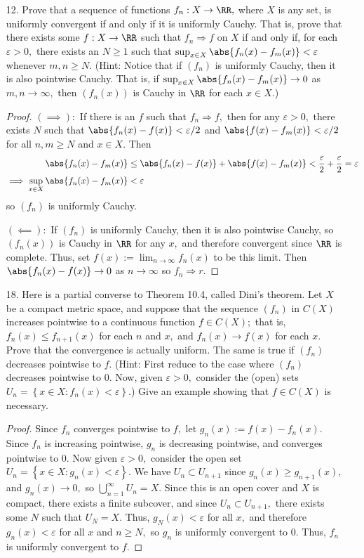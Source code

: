 \documentclass{article}
\begin{document}
\begin{itemize}
	\item[12.] Prove that a sequence of functions $f_n:X\to \RR,$ where $X$ is any set, is uniformly convergent if and only if it is uniformly Cauchy. That is, prove that there exists some $f:X\to\RR$ such that $f_n\Rightarrow f$ on $X$ if and only if, for each $\varepsilon>0,$ there exists an $N\ge 1$ such that $\sup_{x\in X}\abs{f_n(x)-f_m(x)}<\varepsilon$ whenever $m, n\ge N.$ (Hint: Notice that if $(f_n)$ is uniformly Cauchy, then it is also pointwise Cauchy. That is, if $\sup_{x\in X}\abs{f_n(x)-f_m(x)}\to 0$ as $m, n\to \infty,$ then $(f_n(x))$ is Cauchy in $\RR$ for each $x\in X.$)
		\begin{proof}
			$(\implies):$ If there is an $f$ such that $f_n\Rightarrow f,$ then for any $\varepsilon>0,$ there exists $N$ such that $\abs{f_n(x)-f(x)}<\varepsilon/2$ and $\abs{f(x)-f_m(x)}<\varepsilon/2$ for all $n, m\ge N$ and $x\in X.$ Then
			\begin{align*}
				\abs{f_n(x)-f_m(x)} &\le \abs{f_n(x)-f(x)} + \abs{f(x)-f_m(x)} < \frac{\varepsilon}{2} + \frac{\varepsilon}{2} = \varepsilon \\
				\implies \sup_{x\in X} \abs{f_n(x)-f_m(x)} &< \varepsilon
			\end{align*}
			so $(f_n)$ is uniformly Cauchy.

			$(\impliedby):$ If $(f_n)$ is uniformly Cauchy, then it is also pointwise Cauchy, so $(f_n(x))$ is Cauchy in $\RR$ for any $x,$ and therefore convergent since $\RR$ is complete. Thus, set $f(x):=\lim_{n\to\infty} f_n(x)$ to be this limit. Then $\abs{f_n(x)-f(x)}\to 0$ as $n\to\infty$ so $f_n\Rightarrow r.$
		\end{proof}

	\item[18.] Here is a partial converse to Theorem 10.4, called Dini's theorem. Let $X$ be a compact metric space, and suppose that the sequence $(f_n)$ in $C(X)$ increases pointwise to a continuous function $f\in C(X);$ that is, $f_n(x)\le f_{n+1}(x)$ for each $n$ and $x,$ and $f_n(x)\to f(x)$ for each $x.$ Prove that the convergence is actually uniform. The same is true if $(f_n)$ decreases pointwise to $f.$ (Hint: First reduce to the case where $(f_n)$ decreases pointwise to 0. Now, given $\varepsilon>0,$ consider the (open) sets $U_n=\left\{ x\in X:f_n(x)<\varepsilon \right\}.$) Give an example showing that $f\in C(X)$ is necessary.
		\begin{proof}
			Since $f_n$ converges pointwise to $f,$ let $g_n(x):=f(x)-f_n(x).$ Since $f_n$ is increasing pointwise, $g_n$ is decreasing pointwise, and converges pointwise to 0. Now given $\varepsilon>0,$ consider the open set $U_n=\left\{ x\in X:g_n(x)<\varepsilon \right\}.$ We have $U_n\subset U_{n+1}$ since $g_n(x)\ge g_{n+1}(x),$ and $g_n(x)\to 0,$ so $\bigcup_{n=1}^\infty U_n=X.$ Since this is an open cover and $X$ is compact, there exists a finite subcover, and since $U_n\subset U_{n+1},$ there exists some $N$ such that $U_N=X.$ Thus, $g_N(x)<\varepsilon$ for all $x,$ and therefore $g_n(x)<\varepsilon$ for all $x$ and $n\ge N,$ so $g_n$ is uniformly convergent to 0. Thus, $f_n$ is uniformly convergent to $f.$


\end{proof}
\end{itemize}
\end{document}
